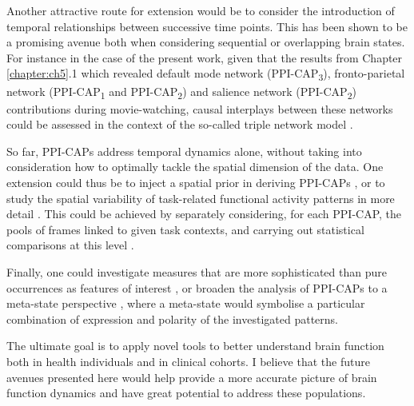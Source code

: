 Another attractive route for extension would be to consider the introduction of temporal relationships between successive time points. This has been shown to be a promising avenue both when considering sequential \citep{Eavani2013,Chen2016, Vidaurre2017} or overlapping \citep{Sourty2016, Bolton2018a} brain states. For instance in the case of the present work, given that the results from Chapter \ref{chapter:ch5}.1 which revealed default mode network (PPI-CAP\textsubscript{3}), fronto-parietal network (PPI-CAP\textsubscript{1} and PPI-CAP\textsubscript{2}) and salience network (PPI-CAP\textsubscript{2}) contributions during movie-watching, causal interplays between these networks could be assessed in the context of the so-called triple network model \citep{Menon2011}. 

So far, PPI-CAPs address temporal dynamics alone, without taking into consideration how to optimally tackle the spatial dimension of the data. One extension could thus be to inject a spatial prior in deriving PPI-CAPs \citep{Zhuang2018}, or to study the spatial variability of task-related functional activity patterns in more detail \citep{Kiviniemi2011}. This could be achieved by separately considering, for each PPI-CAP, the pools of frames linked to given task contexts, and carrying out statistical comparisons at this level \citep{Amico2014}. 


Finally, one could investigate measures that are more sophisticated than pure occurrences as features of interest \citep{Chen2015, Bolton2020}, or broaden the analysis of PPI-CAPs to a meta-state perspective \citep{Miller2016,Vidaurre2017}, where a meta-state would symbolise a particular combination of expression and polarity of the investigated patterns.

The ultimate goal is to apply novel tools to better understand brain function both in health individuals and in clinical cohorts. I believe that the future avenues presented here would help provide a more accurate picture of brain function dynamics and have great potential to address these populations.



